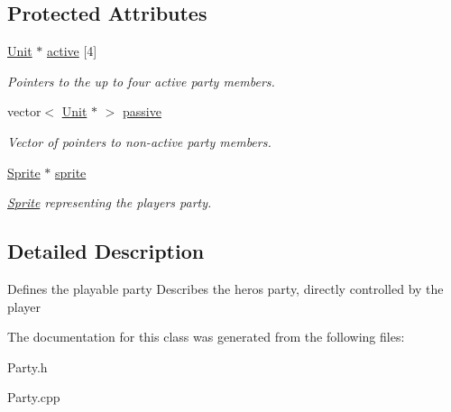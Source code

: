 \subsection*{Protected Attributes}
\begin{DoxyCompactItemize}
\item 
\hyperlink{class_unit}{Unit} $\ast$ \hyperlink{class_party_aca0245ec21a99d76c4f1d00b7299629a}{active} \mbox{[}4\mbox{]}\hypertarget{class_party_aca0245ec21a99d76c4f1d00b7299629a}{}\label{class_party_aca0245ec21a99d76c4f1d00b7299629a}

\begin{DoxyCompactList}\small\item\em Pointers to the up to four active party members. \end{DoxyCompactList}\item 
vector$<$ \hyperlink{class_unit}{Unit} $\ast$ $>$ \hyperlink{class_party_ab1e00e761df6f415ed72a920d4aa9ec6}{passive}\hypertarget{class_party_ab1e00e761df6f415ed72a920d4aa9ec6}{}\label{class_party_ab1e00e761df6f415ed72a920d4aa9ec6}

\begin{DoxyCompactList}\small\item\em Vector of pointers to non-\/active party members. \end{DoxyCompactList}\item 
\hyperlink{class_sprite}{Sprite} $\ast$ \hyperlink{class_party_ae71ba8a78bc7da8b16ff861412b30adb}{sprite}\hypertarget{class_party_ae71ba8a78bc7da8b16ff861412b30adb}{}\label{class_party_ae71ba8a78bc7da8b16ff861412b30adb}

\begin{DoxyCompactList}\small\item\em \hyperlink{class_sprite}{Sprite} representing the player\textquotesingle{}s party. \end{DoxyCompactList}\end{DoxyCompactItemize}


\subsection{Detailed Description}
Defines the playable party Describes the hero\textquotesingle{}s party, directly controlled by the player 

The documentation for this class was generated from the following files\+:\begin{DoxyCompactItemize}
\item 
Party.\+h\item 
Party.\+cpp\end{DoxyCompactItemize}
